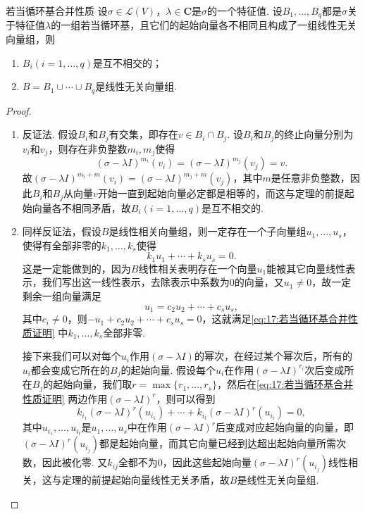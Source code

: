 \begin{lemma}{}{若当循环基合并性质}
    设$\sigma\in\mathcal{L}(V)$，$\lambda\in\mathbf{C}$是$\sigma$的一个特征值. 设$B_1,\ldots,B_q$都是$\sigma$关于特征值$\lambda$的一组若当循环基，且它们的起始向量各不相同且构成了一组线性无关向量组，则
    \begin{enumerate}
        \item $B_i(i=1,\ldots,q)$是互不相交的；
        \item $B=B_1\cup\cdots\cup B_q$是线性无关向量组.
    \end{enumerate}
\end{lemma}
\begin{proof}
    \begin{enumerate}
        \item 反证法. 假设$B_i$和$B_j$有交集，即存在$v\in B_i\cap B_j$. 设$B_i$和$B_j$的终止向量分别为$v_i$和$v_j$，则存在非负整数$m_i,m_j$使得
              \[(\sigma-\lambda I)^{m_i}(v_i)=(\sigma-\lambda I)^{m_j}(v_j)=v.\]
              故$(\sigma-\lambda I)^{m_i+m}(v_i)=(\sigma-\lambda I)^{m_j+m}(v_j)$，其中$m$是任意非负整数，因此$B_i$和$B_j$从向量$v$开始一直到起始向量必定都是相等的，而这与定理的前提起始向量各不相同矛盾，故$B_i(i=1,\ldots,q)$是互不相交的.

        \item 同样反证法，假设$B$是线性相关向量组，则一定存在一个子向量组$u_1,\ldots,u_s$，使得有全部非零的$k_1,\ldots,k_s$使得
              \begin{equation} \label{eq:17:若当循环基合并性质证明}
                  k_1u_1+\cdots+k_su_s=0.
              \end{equation}
              这是一定能做到的，因为$B$线性相关表明存在一个向量$u_1$能被其它向量线性表示，我们写出这一线性表示，去除表示中系数为0的向量，又$u_1\neq 0$，故一定剩余一组向量满足
              \[u_1=c_2u_2+\cdots+c_su_s,\]
              其中$c_i\neq 0$，则$-u_1+c_2u_2+\cdots+c_su_s=0$，这就满足\autoref{eq:17:若当循环基合并性质证明} 中$k_1,\ldots,k_s$全部非零.

              接下来我们可以对每个$u_i$作用$(\sigma-\lambda I)$的幂次，在经过某个幂次后，所有的$u_i$都会变成它所在的$B_j$的起始向量. 假设每个$u_i$在作用$(\sigma-\lambda I)^{r_i}$次后变成所在$B_j$的起始向量，我们取$r=\max\{r_1,\ldots,r_s\}$，然后在\autoref{eq:17:若当循环基合并性质证明} 两边作用$(\sigma-\lambda I)^r$，则可以得到
              \begin{equation}
                  k_{i_1}(\sigma-\lambda I)^r(u_{i_1})+\cdots+k_{i_t}(\sigma-\lambda I)^r(u_{i_t})=0,
              \end{equation}
              其中$u_{i_1},\ldots,u_{i_t}$是$u_1,\ldots,u_s$中在作用$(\sigma-\lambda I)^r$后变成对应起始向量的向量，即$(\sigma-\lambda I)^r(u_{i_j})$都是起始向量，而其它向量已经到达超出起始向量所需次数，因此被化零. 又$k_{ij}$全都不为0，因此这些起始向量$(\sigma-\lambda I)^r(u_{i_j})$线性相关，这与定理的前提起始向量线性无关矛盾，故$B$是线性无关向量组.
    \end{enumerate}
\end{proof}

